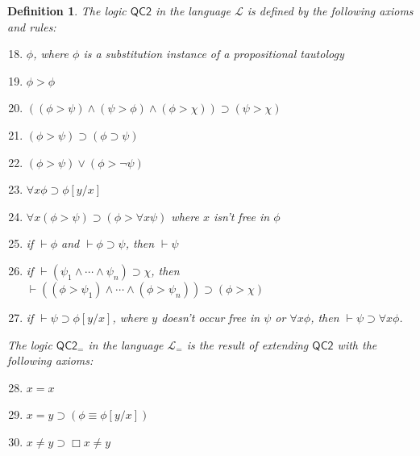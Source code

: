 \documentclass[12pt]{article}
\newtheorem{definition}{Definition}
\newcommand{\would}{\mathbin{>}}
\newcommand{\nec}{\mathop{\Box}}
\newcommand{\then}{\mathbin{\supset}}
\begin{document}
\begin{definition}
\label{def:QC2}
    The logic $\mathsf{QC2}$ in the language $\mathcal{L}$ is defined by the following axioms and rules:
    \begin{enumerate}
    \setcounter{enumi}{17}
        \item $\phi$, where $\phi$ is a substitution instance of a propositional tautology\label{ax:PL}
        \item $\phi \would \phi$\label{ax:id}
        \item $((\phi \would \psi) \wedge (\psi \would \phi) \wedge (\phi \would \chi)) \then (\psi \would \chi)$\label{ax:cso}
        \item $(\phi \would \psi) \then (\phi \then \psi)$\label{ax:cen}
        \item $(\phi \would \psi) \vee (\phi \would \neg\psi)$\label{ax:cem}
        \item $\forall x\phi \then \phi[y/x]$\label{ax:uelim-c}
        \item $\forall x(\phi \would \psi) \then (\phi \would \forall x \psi)$ where $x$ isn't free in $\phi$\label{ax:barcan-gc}
        \item if $\vdash \phi$ and $\vdash \phi \then \psi$, then $\vdash \psi$\label{rule:mp}
        \item if $\vdash (\psi_1 \wedge \cdots \wedge \psi_n) \then \chi$, then $\vdash ((\phi \would \psi_1) \wedge \cdots \wedge (\phi \would \psi_n)) \then (\phi \would \chi)$\label{rule:cnec}
        \item if $\vdash \psi \then \phi[y/x]$, where $y$ doesn't occur free in $\psi$ or $\forall x\phi$, then $\vdash \psi \then \forall x\phi$.\label{rule:uintro-c}
    \end{enumerate}
    The logic $\mathsf{QC2_=}$ in the language $\mathcal{L}_=$ is the result of extending $\mathsf{QC2}$ with the following axioms:
    \begin{enumerate}
    \setcounter{enumi}{27}
        \item $x=x$\label{ax:reflx}
        \item $x = y \then (\phi \equiv \phi[y/x])$\label{ax:subid}
        \item $x \neq y \then \nec x \neq y$\label{ax:necdec}
    \end{enumerate}
\end{definition}
\end{document}
